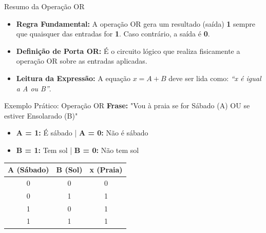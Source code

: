 \begin{frame}{Resumo da Operação OR}
    \begin{itemize}
        \item \textbf{Regra Fundamental:} A operação OR gera um resultado (saída) \textbf{1} sempre que quaisquer das entradas for \textbf{1}. Caso contrário, a saída é \textbf{0}.
        \item \textbf{Definição de Porta OR:} É o circuito lógico que realiza fisicamente a operação OR sobre as entradas aplicadas.
        \item \textbf{Leitura da Expressão:} A equação $x = A + B$ deve ser lida como: \textit{“x é igual a A ou B”}.
    \end{itemize}
\end{frame}

\begin{frame}{Exemplo Prático: Operação OR}
    \textbf{Frase:} "Vou à praia se for Sábado (A) OU se estiver Ensolarado (B)"
    \vspace{0.4cm}
    \begin{itemize}
        \item \textbf{A = 1:} É sábado | \textbf{A = 0:} Não é sábado
        \item \textbf{B = 1:} Tem sol | \textbf{B = 0:} Não tem sol
    \end{itemize}
    \vspace{0.2cm}
    \begin{table}
        \centering
        \begin{tabular}{|c|c||c|}
            \hline
            \textbf{A (Sábado)} & \textbf{B (Sol)} & \textbf{x (Praia)} \\ \hline
            0                   & 0                & 0                  \\ \hline
            0                   & 1                & 1                  \\ \hline
            1                   & 0                & 1                  \\ \hline
            1                   & 1                & 1                  \\ \hline
        \end{tabular}
    \end{table}
\end{frame}


